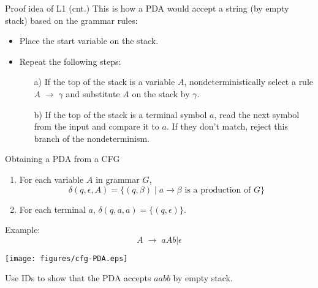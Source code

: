 \documentclass{prosper}%
\newcommand{\ra}{\mbox{$\;\rightarrow\;$}}
\begin{document}
\begin{comment}
\item The PDA's nondeterminism will come in handy, as it allows it to guess the sequence of correct substitutions.
\item $P$'s design sketch: $P$ will push on the stack left-sentential forms of $G$; and it will go through these sentential forms, making one substitution after another. Eventually it {\blue may} arrive at a configuration (a string) that contains only terminals. Then $P$ accepts if this string matches $w$.
\end{itemize}
\end{slide}
\end{comment}

\begin{slide}{Proof idea of L1 (cnt.)}
This is how a PDA would accept a string (by empty stack) based on the grammar rules:
\begin{itemize}
\item Place the start variable on the stack.
\item Repeat the following steps:
\begin{enumerate}
\item[a)] If the top of the stack is a variable $A$, nondeterministically select a rule $A \ra \gamma$ and substitute $A$ on the stack by $\gamma$.
\item[b)] If the top of the stack is a terminal symbol $a$, read the next symbol from the input and compare it to $a$. If they don't match, reject this branch of the nondeterminism.
\end{enumerate}
\end{itemize}
\end{slide}

\begin{slide}{Obtaining a PDA from a CFG}
\begin{enumerate}
\item For each variable $A$ in grammar $G$,
\[
\delta(q, \epsilon, A)=\{(q, \beta)\;|\;a\rightarrow \beta\mbox{ is a production of $G$}\}
\]
\item For each terminal $a$, $\delta(q, a, a)=\{(q, \epsilon)\}$.
\end{enumerate}
\begin{minipage}{6cm}
Example: 
\[
A\ra aAb | \epsilon
\]
\end{minipage}
\begin{minipage}{5cm}
\begin{center}
\texttt{[image: figures/cfg-PDA.eps]}
\end{center}
\end{minipage}
Use IDs to show that the PDA accepts $aabb$ by empty stack.
\end{slide}
\end{document}
